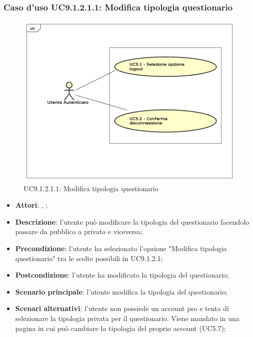 					\subsubsection{Caso d'uso UC9.1.2.1.1: Modifica tipologia questionario}
					\label{UC9.1.2.1.1}
					\begin{figure}[h]
						\centering
					\includegraphics[scale=0.7,keepaspectratio]{UML/UC9.png}
						\caption{UC9.1.2.1.1: Modifica tipologia questionario}
					\end{figure}
					\FloatBarrier
					\begin{itemize}
						\item \textbf{Attori}: \uau, \uaupro;
						\item \textbf{Descrizione}: l'utente può modificare la tipologia del questionario facendolo passare da pubblico a privato e viceversa; 
						\item \textbf{Precondizione}: l'utente ha selezionato l'opzione "Modifica tipologia questionario" tra le scelte possibili in UC9.1.2.1;
						\item \textbf{Postcondizione}: l'utente ha modificato la tipologia del questionario;
						\item \textbf{Scenario principale}: l'utente modifica la tipologia del questionario;
						\item \textbf{Scenari alternativi}: l'utente non possiede un account pro e tenta di selezionare la tipologia privata per il questionario. Viene mandato in una pagina in cui può cambiare la tipologia del proprio account (UC5.7); 
					\end{itemize}
											
